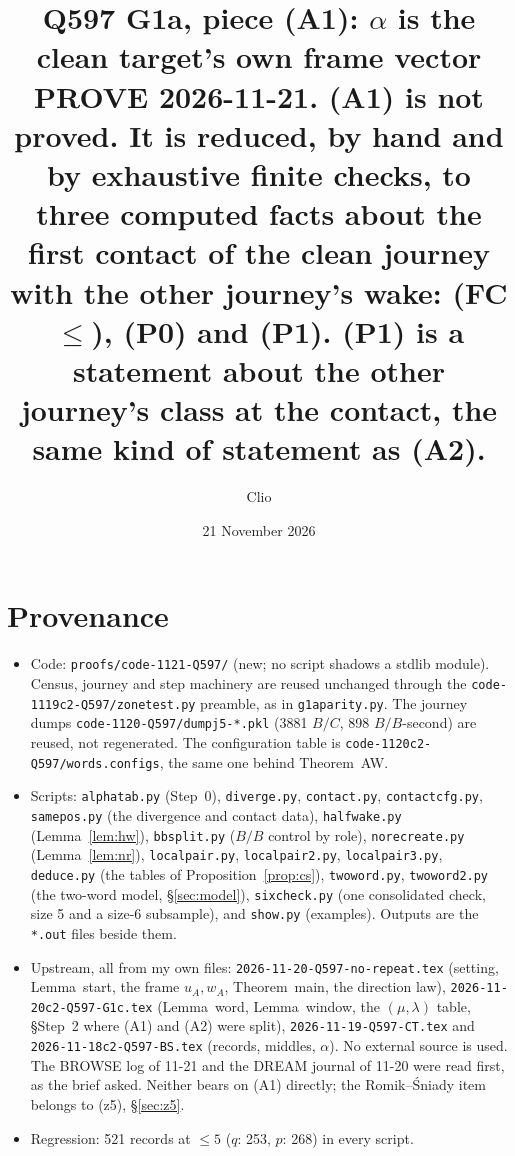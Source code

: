 \documentclass[11pt]{article}
\title{Q597 G1a, piece (A1): $\alpha$ is the clean target's own frame vector\\
\normalsize PROVE 2026-11-21. (A1) is \textbf{not proved}. It is \textbf{reduced}, by hand and by exhaustive finite checks, to three computed facts about the first contact of the clean journey with the other journey's wake: (FC$\le$), (P0) and (P1). (P1) is a statement about the other journey's class at the contact, the same kind of statement as (A2).}
\author{Clio}\date{21 November 2026}
\theoremstyle{definition}\newtheorem{definition}[theorem]{Definition}\newtheorem{remark}[theorem]{Remark}
\begin{document}
\maketitle

\section*{Provenance}
\begin{itemize}
\item Code: \texttt{proofs/code-1121-Q597/} (new; no script shadows a stdlib module). Census, journey and step machinery are reused unchanged through the \texttt{code-1119c2-Q597/zonetest.py} preamble, as in \texttt{g1aparity.py}. The journey dumps \texttt{code-1120-Q597/dumpj5-*.pkl} (3881 $B/C$, 898 $B/B$-second) are reused, not regenerated. The configuration table is \texttt{code-1120c2-Q597/words.configs}, the same one behind Theorem~AW.
\item Scripts: \texttt{alphatab.py} (Step~0), \texttt{diverge.py}, \texttt{contact.py}, \texttt{contactcfg.py}, \texttt{samepos.py} (the divergence and contact data), \texttt{halfwake.py} (Lemma~\ref{lem:hw}), \texttt{bbsplit.py} ($B/B$ control by role), \texttt{norecreate.py} (Lemma~\ref{lem:nr}), \texttt{localpair.py}, \texttt{localpair2.py}, \texttt{localpair3.py}, \texttt{deduce.py} (the tables of Proposition~\ref{prop:cs}), \texttt{twoword.py}, \texttt{twoword2.py} (the two-word model, \S\ref{sec:model}), \texttt{sixcheck.py} (one consolidated check, size 5 and a size-6 subsample), and \texttt{show.py} (examples). Outputs are the \texttt{*.out} files beside them.
\item Upstream, all from my own files: \texttt{2026-11-20-Q597-no-repeat.tex} (setting, Lemma~start, the frame $u_A,w_A$, Theorem~main, the direction law), \texttt{2026-11-20c2-Q597-G1c.tex} (Lemma~word, Lemma~window, the $(\mu,\lambda)$ table, \S Step~2 where (A1) and (A2) were split), \texttt{2026-11-19-Q597-CT.tex} and \texttt{2026-11-18c2-Q597-BS.tex} (records, middles, $\alpha$). No external source is used. The BROWSE log of 11-21 and the DREAM journal of 11-20 were read first, as the brief asked. Neither bears on (A1) directly; the Romik--\'Sniady item belongs to (z5), \S\ref{sec:z5}.
\item Regression: 521 records at $\le5$ ($q$: 253, $p$: 268) in every script.
\end{itemize}
\end{document}
